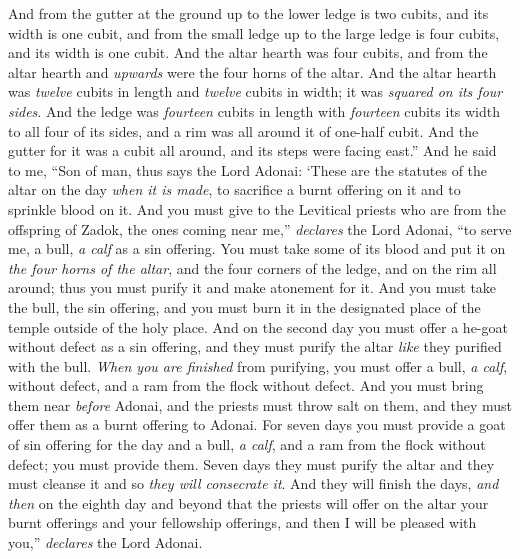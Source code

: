 \begin{biblechapter}
\verse And from the gutter at the ground up to the lower ledge is two cubits, and its width is one cubit, and from the small ledge up to the large ledge is four cubits, and its width is one cubit.
\verse And the altar hearth was four cubits, and from the altar hearth and \textit{upwards} were the four horns of the altar.
\verse And the altar hearth was \textit{twelve} cubits in length and \textit{twelve} cubits in width; it was \textit{squared on its four sides}.
\verse And the ledge was \textit{fourteen} cubits in length with \textit{fourteen} cubits its width to all four of its sides, and a rim was all around it of one-half cubit. And the gutter for it was a cubit all around, and its steps were facing east.”
\verse And he said to me, “Son of man, thus says the Lord Adonai: ‘These are the statutes of the altar on the day \textit{when it is made}, to sacrifice a burnt offering on it and to sprinkle blood on it.
\verse And you must give to the Levitical priests who are from the offspring of Zadok, the ones coming near me,” \textit{declares} the Lord Adonai, “to serve me, a bull, \textit{a calf} as a sin offering.
\verse You must take some of its blood and put it on \textit{the four horns of the altar}, and the four corners of the ledge, and on the rim all around; thus you must purify it and make atonement for it.
\verse And you must take the bull, the sin offering, and you must burn it in the designated place of the temple outside of the holy place.
\verse And on the second day you must offer a he-goat without defect as a sin offering, and they must purify the altar \textit{like} they purified with the bull.
\verse \textit{When you are finished} from purifying, you must offer a bull, \textit{a calf}, without defect, and a ram from the flock without defect.
\verse And you must bring them near \textit{before} Adonai, and the priests must throw salt on them, and they must offer them as a burnt offering to Adonai.
\verse For seven days you must provide a goat of sin offering for the day and a bull, \textit{a calf}, and a ram from the flock without defect; you must provide them.
\verse Seven days they must purify the altar and they must cleanse it and so \textit{they will consecrate it}.
\verse And they will finish the days, \textit{and then} on the eighth day and beyond that the priests will offer on the altar your burnt offerings and your fellowship offerings, and then I will be pleased with you,” \textit{declares} the Lord Adonai.
\end{biblechapter}

